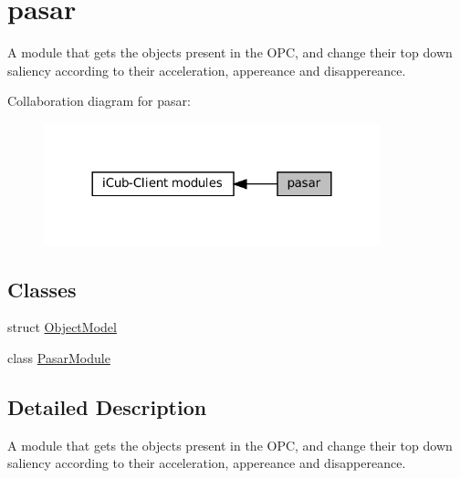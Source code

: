 \hypertarget{group__pasar}{}\section{pasar}
\label{group__pasar}


A module that gets the objects present in the O\+PC, and change their top down saliency according to their acceleration, appereance and disappereance.  


Collaboration diagram for pasar\+:
\nopagebreak
\begin{figure}[H]
\begin{center}
\leavevmode
\includegraphics[width=276pt]{group__pasar}
\end{center}
\end{figure}
\subsection*{Classes}
\begin{DoxyCompactItemize}
\item 
struct \hyperlink{group__pasar_structObjectModel}{Object\+Model}
\item 
class \hyperlink{group__pasar_classPasarModule}{Pasar\+Module}
\end{DoxyCompactItemize}


\subsection{Detailed Description}
A module that gets the objects present in the O\+PC, and change their top down saliency according to their acceleration, appereance and disappereance. 

